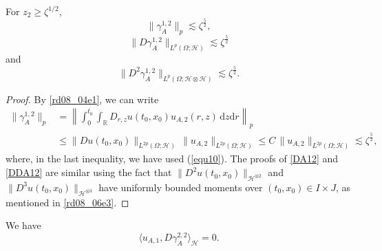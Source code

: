 \documentclass[12pt,a4paper]{article}
\newcommand{\R}{{\mathbb{R}}}
\newcommand{\HH}{\mathcal{H}}
\renewcommand{\d}{\mathrm{d}}
\newcommand {\deltah}{{\zeta}}
\newcommand{\<}{\langle}
\renewcommand{\>}{\rangle}
\begin{document}
 
  \begin{lemma}\label{lem:Dgamma12}
   For $z_2\geq \deltah^{1/2}$, 
\begin{equation} \label{A12}
   \| \gamma_A^{1,2}\|_p \lesssim \deltah^{\frac 52},
\end{equation}
 \begin{equation} \label{DA12}
   \| D\gamma_A^{1,2}\|_{L^p(\Omega;\HH)} \lesssim \deltah^{\frac 52}
\end{equation}
   and
 \begin{equation} \label{DDA12}
       \| D^2\gamma_A^{1,2}\|_{L^p(\Omega;\HH\otimes \HH)} \lesssim \deltah^{\frac 52}.
\end{equation}
  \end{lemma}
  
  \begin{proof}
  By \eqref{rd08_04e1}, we can write
  \begin{align*}
  \| \gamma_A^{1,2}\|_p&= \left \| \int_0^{t_0} \int_\R D_{r,z} u(t_0,x_0) u_{A,2}(r,z)\, \d z \d r \right\|_p\\
  &\le  \| Du(t_0,x_0) \|_{L^{2p}(\Omega;\HH)}\, \|u_{A,2}\|_{L^{2p}(\Omega;\HH)}  
  \le C\, \|u_{A,2}\|_{L^{2p}(\Omega;\HH)}  \lesssim \deltah^{\frac 52},
  \end{align*}
  where, in the last inequality, we have used (\ref{equ10}).  The proofs of \eqref{DA12} and \eqref{DDA12} are similar using the fact that  $\|D^2u(t_0, x_0)\|_{\HH^{\otimes2}}$ and $\|D^3u(t_0, x_0)\|_{\HH^{\otimes3}}$ have uniformly bounded moments  over $(t_0, x_0)\in I \times J$, %
as mentioned in \eqref{rd08_06e3}.
  \end{proof}
  
  
 \begin{lemma} \label{vanish}
 We have
   \begin{equation} \label{for7}
  \langle u_{A,1},  D\gamma_A^{2,2}\rangle_\HH=0.
  \end{equation}
 \end{lemma}
 
\end{document}
